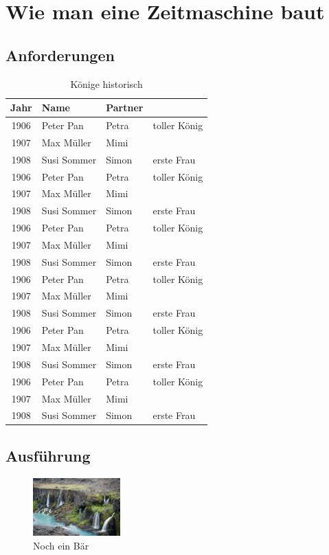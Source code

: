 \chapter{Wie man eine Zeitmaschine baut}

\lipsum[1-1] 

\section{Anforderungen}

\lipsum[1-1]

\begin{table}
  \centering
  \begin{tabularx}{0.9\textwidth}{ c l l X }
    Jahr & Name & Partner & \\
    \hline\noalign{\smallskip}
    1906 & Peter Pan & Petra & toller König \\ 
    1907 & Max Müller & Mimi &  \\  
    1908 & Susi Sommer & Simon & erste Frau \\
    1906 & Peter Pan & Petra & toller König \\ 
    1907 & Max Müller & Mimi &  \\  
    1908 & Susi Sommer & Simon & erste Frau \\
    1906 & Peter Pan & Petra & toller König \\ 
    1907 & Max Müller & Mimi &  \\  
    1908 & Susi Sommer & Simon & erste Frau \\
    1906 & Peter Pan & Petra & toller König \\ 
    1907 & Max Müller & Mimi &  \\  
    1908 & Susi Sommer & Simon & erste Frau \\
    1906 & Peter Pan & Petra & toller König \\ 
    1907 & Max Müller & Mimi &  \\  
    1908 & Susi Sommer & Simon & erste Frau \\
    1906 & Peter Pan & Petra & toller König \\ 
    1907 & Max Müller & Mimi &  \\  
    1908 & Susi Sommer & Simon & erste Frau \\
  \end{tabularx}
  \caption{Könige historisch}
  \label{fig:tab_koenige_historisch}
\end{table}

\section{Ausführung}

\lipsum[1-1]

\begin{figure}
  \centering
  \includegraphics[width=0.3\textwidth]{fotos/b}
  \caption{Noch ein Bär}
\end{figure}

\lipsum[1-4]